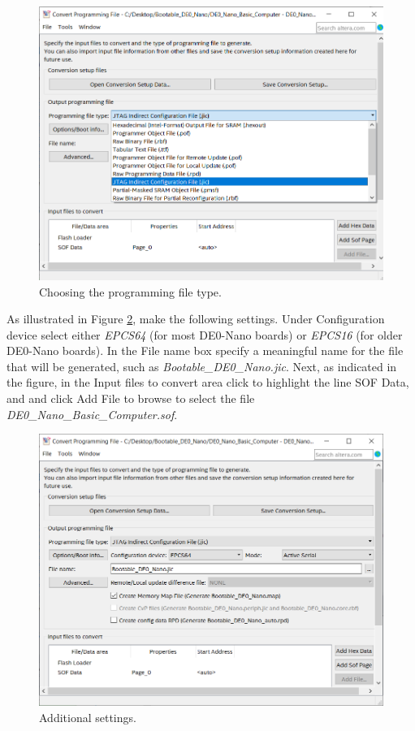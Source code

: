 \documentclass[11pt, twoside, pdftex]{article}
\begin{document}
\begin{figure}[H]
   \begin{center}
        \includegraphics[scale=.5]{figures/jic1.png}
   \end{center}
   \caption{Choosing the programming file type.}
	\label{fig:jic1}
\end{figure}

As illustrated in Figure \ref{fig:jic2}, make the following settings. Under {\sf Configuration
device} select either {\it EPCS64} (for most DE0-Nano boards) or {\it EPCS16} (for older DE0-Nano
boards). In the {\sf File name} box specify a meaningful name for the file that will be
generated, such as {\it Bootable\_DE0\_Nano.jic}.  Next, as indicated in the figure, 
in the {\sf Input files to convert} area click to highlight the line {\sf SOF Data}, 
and and click {\sf Add File} to browse to select the file {\it DE0\_Nano\_Basic\_Computer.sof}.

\begin{figure}[H]
   \begin{center}
        \includegraphics[scale=.5]{figures/jic2.png}
   \end{center}
   \caption{Additional settings.}
	\label{fig:jic2}
\end{figure}
\end{document}
